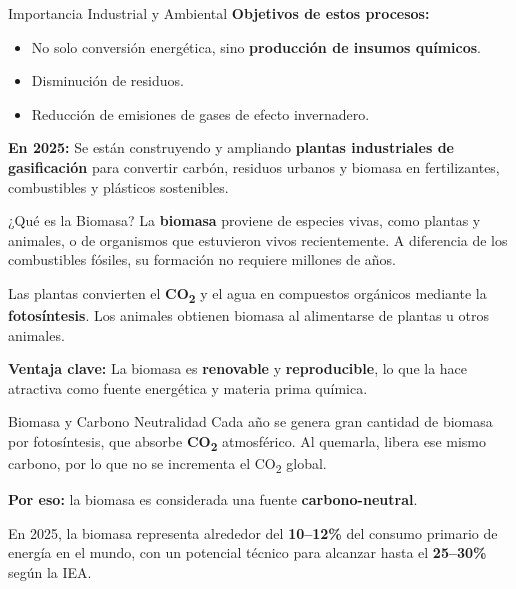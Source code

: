 \documentclass[../../main.tex]{subfiles}
\begin{document}
\begin{frame}{Importancia Industrial y Ambiental}
\justifying
\textbf{Objetivos de estos procesos:}
\begin{itemize}
  \item No solo conversión energética, sino \textbf{producción de insumos químicos}.
  \item Disminución de residuos.
  \item Reducción de emisiones de gases de efecto invernadero.
\end{itemize}

\textbf{En 2025:} Se están construyendo y ampliando \textbf{plantas industriales de gasificación} para convertir carbón, residuos urbanos y biomasa en fertilizantes, combustibles y plásticos sostenibles.
\end{frame}

\begin{frame}{¿Qué es la Biomasa?}
\justifying
La \textbf{biomasa} proviene de especies vivas, como plantas y animales, o de organismos que estuvieron vivos recientemente. A diferencia de los combustibles fósiles, su formación no requiere millones de años.

\vspace{0.5em}
Las plantas convierten el \textbf{CO\textsubscript{2}} y el agua en compuestos orgánicos mediante la \textbf{fotosíntesis}. Los animales obtienen biomasa al alimentarse de plantas u otros animales.

\vspace{0.5em}
\textbf{Ventaja clave:} La biomasa es \textbf{renovable} y \textbf{reproducible}, lo que la hace atractiva como fuente energética y materia prima química.
\end{frame}

\begin{frame}{Biomasa y Carbono Neutralidad}
\justifying
Cada año se genera gran cantidad de biomasa por fotosíntesis, que absorbe \textbf{CO\textsubscript{2}} atmosférico. Al quemarla, libera ese mismo carbono, por lo que no se incrementa el CO\textsubscript{2} global.

\vspace{1em}
\textbf{Por eso:} la biomasa es considerada una fuente \textbf{carbono-neutral}.

\vspace{1em}
En 2025, la biomasa representa alrededor del \textbf{10–12\%} del consumo primario de energía en el mundo, con un potencial técnico para alcanzar hasta el \textbf{25–30\%} según la IEA.
\end{frame}
\end{document}
